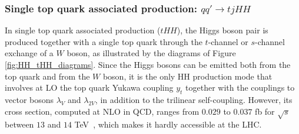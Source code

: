 \subsubsection{Single top quark associated production: $qq'\rightarrow tjHH$}
%
In single top quark associated production ($tHH$), the Higgs boson pair is produced together with a single top quark through the $t$-channel or $s$-channel exchange of a $W$ boson, as illustrated by the diagrams of Figure \ref{fig:HH_tHH_diagrams}. Since the Higgs bosons can be emitted both from the top quark and from the $W$ boson, it is the only HH production mode that involves at LO the top quark Yukawa coupling $y_t$ together with the couplings to vector bosons $\lambda_V$ and $\lambda_{2V}$, in addition to the trilinear self-coupling. However, its cross section, computed at NLO in QCD, ranges from $0.029$ to $0.037$ fb for $\sqrt{s}$ between $13$ and $14$ TeV~\cite{Frederix:2014hta,LHCHWG:HHlegacy}, which makes it hardly accessible at the LHC.\bigskip
%
